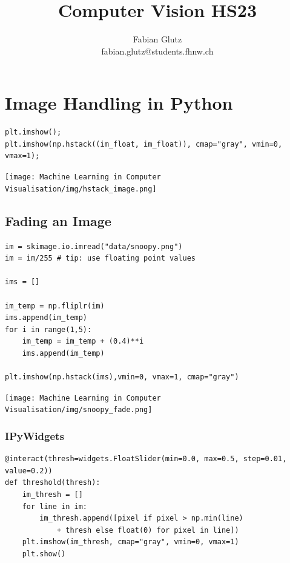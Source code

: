 \documentclass[x11names,11pt,a4paper]{article}
\theoremstyle{definition}
\begin{document}
	
\title{Computer Vision HS23}
\author{Fabian Glutz\\fabian.glutz@students.fhnw.ch}
\maketitle




\tableofcontents
\newpage


\section{Image Handling in Python}

\begin{verbatim}
plt.imshow();
plt.imshow(np.hstack((im_float, im_float)), cmap="gray", vmin=0, vmax=1);
\end{verbatim}

\begin{center}
	\texttt{[image: Machine Learning in Computer Visualisation/img/hstack\_image.png]}
\end{center}

\subsection{Fading an Image}
\begin{verbatim}
im = skimage.io.imread("data/snoopy.png")
im = im/255 # tip: use floating point values

ims = []

im_temp = np.fliplr(im)
ims.append(im_temp)
for i in range(1,5):
	im_temp = im_temp + (0.4)**i
	ims.append(im_temp)

plt.imshow(np.hstack(ims),vmin=0, vmax=1, cmap="gray")
\end{verbatim}

\begin{center}
	\texttt{[image: Machine Learning in Computer Visualisation/img/snoopy\_fade.png]}
\end{center}

\subsubsection{IPyWidgets}
\begin{verbatim}
@interact(thresh=widgets.FloatSlider(min=0.0, max=0.5, step=0.01, value=0.2))
def threshold(thresh):
	im_thresh = []
	for line in im:
		im_thresh.append([pixel if pixel > np.min(line) 
			+ thresh else float(0) for pixel in line])
	plt.imshow(im_thresh, cmap="gray", vmin=0, vmax=1)
	plt.show()
\end{verbatim}
\end{document}
